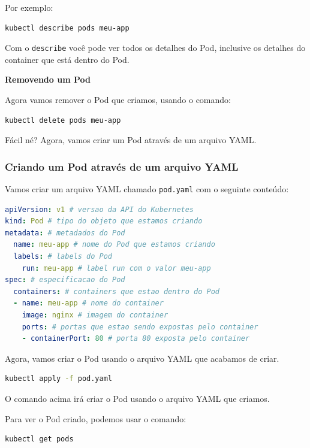 \documentclass[12pt,a4paper]{article}
\begin{document}
Por exemplo:

\begin{lstlisting}[language=bash]
kubectl describe pods meu-app
\end{lstlisting}

Com o \texttt{describe} você pode ver todos os detalhes do Pod, inclusive os detalhes do container que está dentro do Pod.


\textbf{Removendo um Pod}

Agora vamos remover o Pod que criamos, usando o comando:

\begin{lstlisting}[language=bash]
kubectl delete pods meu-app
\end{lstlisting}

Fácil né? Agora, vamos criar um Pod através de um arquivo YAML.

\subsubsection{Criando um Pod através de um arquivo YAML}
\label{sec:pod_yaml}

Vamos criar um arquivo YAML chamado \texttt{pod.yaml} com o seguinte conteúdo:

\begin{lstlisting}[language=yaml]
apiVersion: v1 # versao da API do Kubernetes
kind: Pod # tipo do objeto que estamos criando
metadata: # metadados do Pod 
  name: meu-app # nome do Pod que estamos criando
  labels: # labels do Pod
    run: meu-app # label run com o valor meu-app
spec: # especificacao do Pod
  containers: # containers que estao dentro do Pod
  - name: meu-app # nome do container
    image: nginx # imagem do container
    ports: # portas que estao sendo expostas pelo container
    - containerPort: 80 # porta 80 exposta pelo container
\end{lstlisting}

Agora, vamos criar o Pod usando o arquivo YAML que acabamos de criar.

\begin{lstlisting}[language=bash]
kubectl apply -f pod.yaml
\end{lstlisting}

O comando acima irá criar o Pod usando o arquivo YAML que criamos.

Para ver o Pod criado, podemos usar o comando:

\begin{lstlisting}[language=bash]
kubectl get pods
\end{lstlisting}
\end{document}
